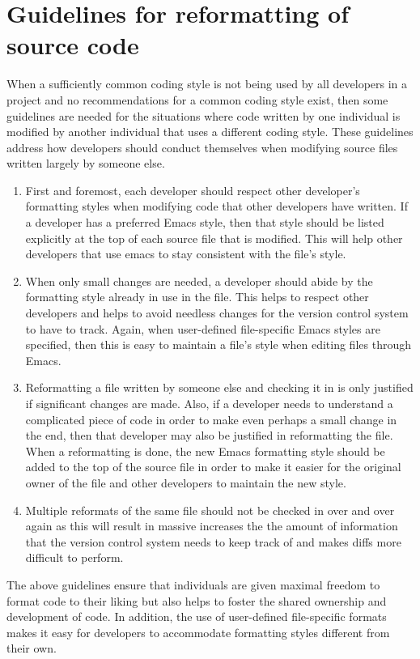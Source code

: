 %
\section{Guidelines for reformatting of source code}
\label{sec:reformatting-guidelines}
%

When a sufficiently common coding style is not being used by all developers in
a project and no recommendations for a common coding style exist, then some
guidelines are needed for the situations where code written by one individual
is modified by another individual that uses a different coding style.  These
guidelines address how developers should conduct themselves when modifying
source files written largely by someone else.

\begin{enumerate}

{}\item First and foremost, each developer should respect other developer's
formatting styles when modifying code that other developers have written.  If
a developer has a preferred Emacs style, then that style should be listed
explicitly at the top of each source file that is modified.  This will help
other developers that use emacs to stay consistent with the file's style.

{}\item When only small changes are needed, a developer should abide by the
formatting style already in use in the file.  This helps to respect other
developers and helps to avoid needless changes for the version control system
to have to track.  Again, when user-defined file-specific Emacs styles are
specified, then this is easy to maintain a file's style when editing files
through Emacs.

{}\item Reformatting a file written by someone else and checking it in is only
justified if significant changes are made.  Also, if a developer needs to
understand a complicated piece of code in order to make even perhaps a small
change in the end, then that developer may also be justified in reformatting
the file.  When a reformatting is done, the new Emacs formatting style should
be added to the top of the source file in order to make it easier for the
original owner of the file and other developers to maintain the new style.

{}\item Multiple reformats of the same file should not be checked in over and
over again as this will result in massive increases the the amount of
information that the version control system needs to keep track of and makes
diffs more difficult to perform.

\end{enumerate}

The above guidelines ensure that individuals are given maximal freedom to
format code to their liking but also helps to foster the shared ownership and
development of code.  In addition, the use of user-defined file-specific
formats makes it easy for developers to accommodate formatting styles
different from their own.
